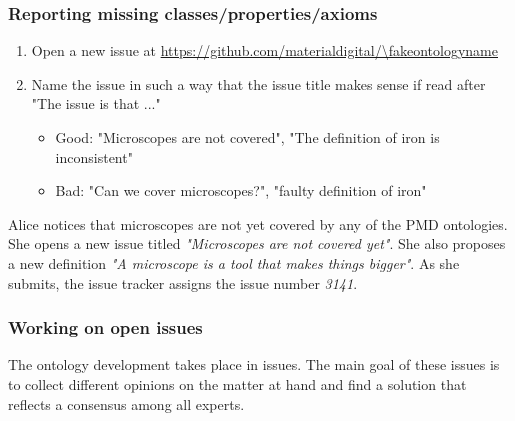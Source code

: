 \subsubsection{Reporting missing classes/properties/axioms}
\begin{enumerate}
    \item Open a new issue at \url{https://github.com/materialdigital/\fakeontologyname}
    \item Name the issue in such a way that the issue title makes sense if read after "The issue is that ..."
    \begin{itemize}
        \item Good: "Microscopes are not covered", "The definition of iron is inconsistent"
        \item Bad: "Can we cover microscopes?", "faulty definition of iron"
    \end{itemize}
\end{enumerate}

\begin{example}
    Alice notices that microscopes are not yet covered by any of the PMD ontologies. She opens a new issue titled \textit{"Microscopes are not covered yet"}. She also proposes a new definition \textit{"A microscope is a tool that makes things bigger"}. As she submits, the issue tracker assigns the issue number \textit{3141}.
\end{example}

\subsubsection{Working on open issues}

The ontology development takes place in {\github} issues. The main goal of these issues is to collect different opinions on the matter at hand and find a solution that reflects a consensus among all experts.

